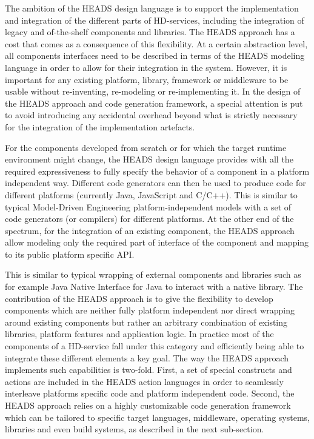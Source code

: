 The ambition of the HEADS design language is to support the implementation and integration of the different parts of HD-services, including the integration of legacy and of-the-shelf components and libraries. The HEADS approach has a cost that comes as a consequence of this flexibility. At a certain abstraction level, all components interfaces need to be described in terms of the HEADS modeling language in order to allow for their integration in the system. However, it is important for any existing platform, library, framework or middleware to be usable without re-inventing, re-modeling or re-implementing it. In the design of the HEADS approach and code generation framework, a special attention is put to avoid introducing any accidental overhead beyond what is strictly necessary for the integration of the implementation artefacts. 

For the components developed from scratch or for which the target runtime environment might change, the HEADS design language provides with all the required expressiveness to fully specify the behavior of a component in a platform independent way. Different code generators can then be used to produce code for different platforms (currently Java, JavaScript and C/C++). This is similar to typical Model-Driven Engineering platform-independent models with a set of code generators (or compilers) for different platforms. At the other end of the spectrum, for the integration of an existing component, the HEADS approach allow modeling only the required part of interface of the component and mapping to its public platform specific API. 

This is similar to typical wrapping of external components and libraries such as for example Java Native Interface for Java to interact with a native library. The contribution of the HEADS approach is to give the flexibility to develop components which are neither fully platform independent nor direct wrapping around existing components but rather an arbitrary combination of existing libraries, platform features and application logic. In practice most of the components of a HD-service fall under this category and efficiently being able to integrate these different elements a key goal. The way the HEADS approach implements such capabilities is two-fold. First, a set of special constructs and actions are included in the HEADS action languages in order to seamlessly interleave platforms specific code and platform independent code. Second, the HEADS approach relies on a highly customizable code generation framework which can be tailored to specific target languages, middleware, operating systems, libraries and even build systems, as described in the next sub-section.

